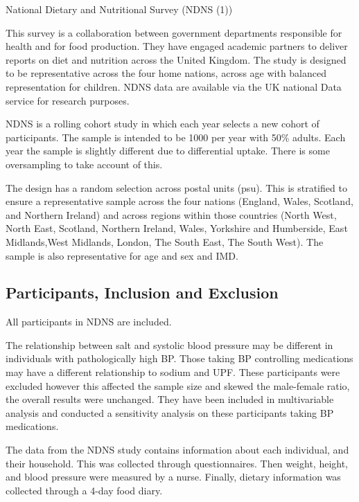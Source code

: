 \documentclass[
]{article}
\begin{document}
National Dietary and Nutritional Survey (NDNS (1))

This survey is a collaboration between government departments
responsible for health and for food production. They have engaged
academic partners to deliver reports on diet and nutrition across the
United Kingdom. The study is designed to be representative across the
four home nations, across age with balanced representation for children.
NDNS data are available via the UK national Data service for research
purposes.

NDNS is a rolling cohort study in which each year selects a new cohort
of participants. The sample is intended to be 1000 per year with 50\%
adults. Each year the sample is slightly different due to differential
uptake. There is some oversampling to take account of this.

The design has a random selection across postal units (psu). This is
stratified to ensure a representative sample across the four nations
(England, Wales, Scotland, and Northern Ireland) and across regions
within those countries (North West, North East, Scotland, Northern
Ireland, Wales, Yorkshire and Humberside, East Midlands,West Midlands,
London, The South East, The South West). The sample is also
representative for age and sex and IMD.

\hypertarget{participants-inclusion-and-exclusion}{%
\subsection{Participants, Inclusion and
Exclusion}\label{participants-inclusion-and-exclusion}}

All participants in NDNS are included.

The relationship between salt and systolic blood pressure may be
different in individuals with pathologically high BP. Those taking BP
controlling medications may have a different relationship to sodium and
UPF. These participants were excluded however this affected the sample
size and skewed the male-female ratio, the overall results were
unchanged. They have been included in multivariable analysis and
conducted a sensitivity analysis on these participants taking BP
medications.

The data from the NDNS study contains information about each individual,
and their household. This was collected through questionnaires. Then
weight, height, and blood pressure were measured by a nurse. Finally,
dietary information was collected through a 4-day food diary.
\end{document}
